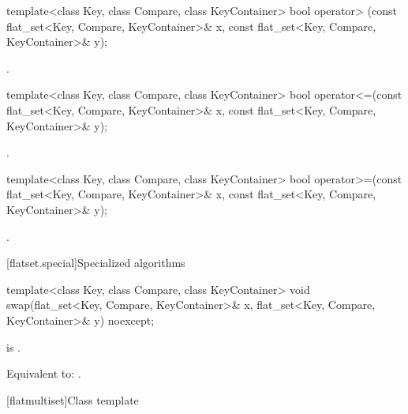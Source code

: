 \begin{codeblock}
\begin{codeblock}
\begin{codeblock}
\begin{addedblock}
%
\begin{itemdecl}
template<class Key, class Compare, class KeyContainer>
  bool operator> (const flat_set<Key, Compare, KeyContainer>& x,
                  const flat_set<Key, Compare, KeyContainer>& y);
\end{itemdecl}

\begin{itemdescr}
\pnum \returns {}.
\end{itemdescr}

%
\begin{itemdecl}
template<class Key, class Compare, class KeyContainer>
  bool operator<=(const flat_set<Key, Compare, KeyContainer>& x,
                  const flat_set<Key, Compare, KeyContainer>& y);
\end{itemdecl}

\begin{itemdescr}
\pnum \returns {}.
\end{itemdescr}

%
\begin{itemdecl}
template<class Key, class Compare, class KeyContainer>
  bool operator>=(const flat_set<Key, Compare, KeyContainer>& x,
                  const flat_set<Key, Compare, KeyContainer>& y);
\end{itemdecl}

\begin{itemdescr}
\pnum \returns {}.
\end{itemdescr}

[flatset.special]{Specialized algorithms}

%
\begin{itemdecl}
template<class Key, class Compare, class KeyContainer>
  void swap(flat_set<Key, Compare, KeyContainer>& x,
            flat_set<Key, Compare, KeyContainer>& y) noexcept;
\end{itemdecl}

\begin{itemdescr}
\pnum \constraints {} is .

\pnum
\effects Equivalent to: .
\end{itemdescr}

[flatmultiset]{Class template }


\end{addedblock}
\end{codeblock}
\end{codeblock}
\end{codeblock}

